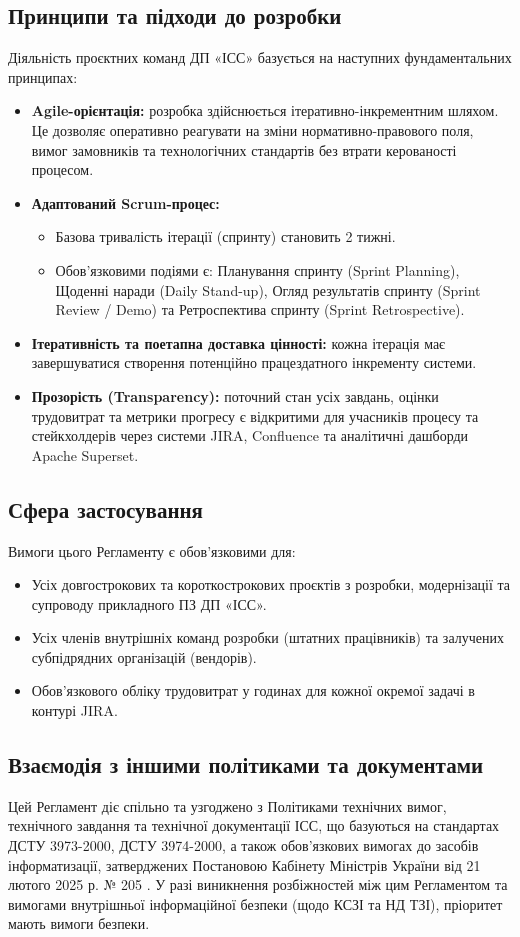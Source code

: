 \documentclass{article}
\begin{document}
\subsection{Принципи та підходи до розробки}
Діяльність проєктних команд ДП «ІСС» базується на наступних фундаментальних принципах:
\begin{itemize}
    \item \textbf{Agile-орієнтація:} розробка здійснюється ітеративно-інкрементним шляхом. Це дозволяє оперативно реагувати на зміни нормативно-правового поля, вимог замовників та технологічних стандартів без втрати керованості процесом.
    \item \textbf{Адаптований Scrum-процес:}
    \begin{itemize}
        \item Базова тривалість ітерації (спринту) становить 2 тижні.
        \item Обов'язковими подіями є: Планування спринту (Sprint Planning), Щоденні наради (Daily Stand-up), Огляд результатів спринту (Sprint Review / Demo) та Ретроспектива спринту (Sprint Retrospective).
    \end{itemize}
    \item \textbf{Ітеративність та поетапна доставка цінності:} кожна ітерація має завершуватися створення потенційно працездатного інкременту системи.
    \item \textbf{Прозорість (Transparency):} поточний стан усіх завдань, оцінки трудовитрат та метрики прогресу є відкритими для учасників процесу та стейкхолдерів через системи JIRA, Confluence та аналітичні дашборди Apache Superset.
\end{itemize}

\subsection{Сфера застосування}
Вимоги цього Регламенту є обов'язковими для:
\begin{itemize}
    \item Усіх довгострокових та короткострокових проєктів з розробки, модернізації та супроводу прикладного ПЗ ДП «ІСС».
    \item Усіх членів внутрішніх команд розробки (штатних працівників) та залучених субпідрядних організацій (вендорів).
    \item Обов'язкового обліку трудовитрат у годинах для кожної окремої задачі в контурі JIRA.
\end{itemize}

\subsection{Взаємодія з іншими політиками та документами}
Цей Регламент діє спільно та узгоджено з Політиками технічних вимог, технічного завдання та технічної документації ІСС, що базуються на стандартах ДСТУ 3973-2000, ДСТУ 3974-2000, а також обов'язкових вимогах до засобів інформатизації, затверджених Постановою Кабінету Міністрів України від 21 лютого 2025 р. № 205 \cite{kmu205}. У разі виникнення розбіжностей між цим Регламентом та вимогами внутрішньої інформаційної безпеки (щодо КСЗІ та НД ТЗІ), пріоритет мають вимоги безпеки.
\end{document}
